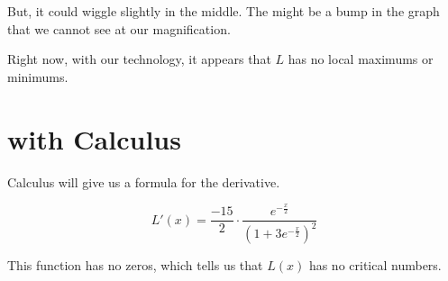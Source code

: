 \documentclass{ximera}
\begin{document}
But, it could wiggle slightly in the middle. The might be a bump in the graph that we cannot see at our magnification.

Right now, with our technology, it appears that $L$ has no local maximums or minimums. 



\section{with Calculus}


Calculus will give us a formula for the derivative.

\[  L'(x) =   \frac{-15}{2} \cdot \frac{e^{-\tfrac{x}{2}}}{\left(1+3 e^{-\tfrac{x}{2}}\right)^2}    \]


This function has no zeros, which tells us that $L(x)$ has no critical numbers.
\end{document}
